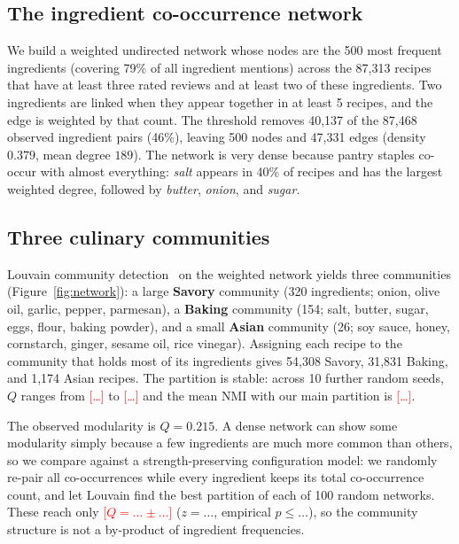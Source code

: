 \documentclass[9pt,twocolumn]{pnas-new}
\newcommand{\tbd}[1]{\textcolor{red}{[#1]}}
\begin{document}
\subsection*{The ingredient co-occurrence network}

We build a weighted undirected network whose nodes are the 500 most frequent ingredients (covering 79\% of all ingredient mentions) across the 87,313 recipes that have at least three rated reviews and at least two of these ingredients. Two ingredients are linked when they appear together in at least 5 recipes, and the edge is weighted by that count. The threshold removes 40,137 of the 87,468 observed ingredient pairs (46\%), leaving 500 nodes and 47,331 edges (density $0.379$, mean degree $189$). The network is very dense because pantry staples co-occur with almost everything: \textit{salt} appears in 40\% of recipes and has the largest weighted degree, followed by \textit{butter}, \textit{onion}, and \textit{sugar}.

\subsection*{Three culinary communities}

Louvain community detection~\cite{blondel2008fast} on the weighted network yields three communities (Figure~\ref{fig:network}): a large \textbf{Savory} community (320 ingredients; onion, olive oil, garlic, pepper, parmesan), a \textbf{Baking} community (154; salt, butter, sugar, eggs, flour, baking powder), and a small \textbf{Asian} community (26; soy sauce, honey, cornstarch, ginger, sesame oil, rice vinegar). Assigning each recipe to the community that holds most of its ingredients gives 54,308 Savory, 31,831 Baking, and 1,174 Asian recipes. The partition is stable: across 10 further random seeds, $Q$ ranges from \tbd{\ldots} to \tbd{\ldots} and the mean NMI with our main partition is \tbd{\ldots}.

The observed modularity is $Q = 0.215$. A dense network can show some modularity simply because a few ingredients are much more common than others, so we compare against a strength-preserving configuration model: we randomly re-pair all co-occurrences while every ingredient keeps its total co-occurrence count, and let Louvain find the best partition of each of 100 random networks. These reach only \tbd{$Q = \ldots \pm \ldots$} ($z = \ldots$, empirical $p \le \ldots$), so the community structure is not a by-product of ingredient frequencies.
\end{document}
